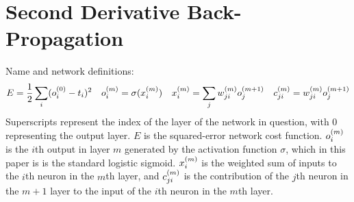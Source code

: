 \pagebreak
\section{Second Derivative Back-Propagation}
Name and network definitions:\\[5pt]
\begin{align}
E &= \frac{1}{2}\sum\limits_i (o_{i}^{(0)} - t_{i})^2 &
o_{i}^{(m)} &= \sigma(x_{i}^{(m)}) &
x_{i}^{(m)} &= \sum\limits_j {w_{ji}^{(m)}}{ o_{j}^{(m + 1)}} &
c_{ji}^{(m)} = w_{ji}^{(m)} o_{j}^{(m+1)}
\end{align}
Superscripts represent the index of the layer of the network in question, with 0 representing the output layer. $E$ is the squared-error network cost function. $o_{i}^{(m)}$ is the $i$th output in layer $m$ generated by the activation function $\sigma$, which in this paper is is the standard logistic sigmoid. $x_{i}^{(m)}$ is the weighted sum of inputs to the $i$th neuron in the $m$th layer, and $c_{ji}^{(m)}$ is the contribution of the $j$th neuron in the $m+1$ layer to the input of the $i$th neuron in the $m$th layer. 
